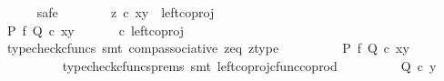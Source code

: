 \begin{isabellebody}
\ \ \ \ \isamarkupfalse%
\ safe\isanewline
\ \ \ \ \ \ \isamarkupfalse%
\ {\isachardoublequoteopen}z\ {\isasymcirc}\isactrlsub c\ {\isasymlangle}x{\isacharcomma}{\kern0pt}y{\isasymrangle}\ {\isacharequal}{\kern0pt}\ left{\isacharunderscore}{\kern0pt}coproj\ {\isasymone}\ {\isacharparenleft}{\kern0pt}{\isasymone}\ {\isasymCoprod}\ {\isasymone}{\isacharparenright}{\kern0pt}{\isachardoublequoteclose}\isanewline
\ \ \ \ \ \ \isamarkupfalse%
\ \isamarkupfalse%
\ {\isachardoublequoteopen}{\isacharparenleft}{\kern0pt}P\ {\isasymtimes}\isactrlsub f\ Q{\isacharparenright}{\kern0pt}\ {\isasymcirc}\isactrlsub c\ {\isasymlangle}x{\isacharcomma}{\kern0pt}y{\isasymrangle}\ {\isacharequal}{\kern0pt}\ {\isacharparenleft}{\kern0pt}{\isasymlangle}{\isasymt}{\isacharcomma}{\kern0pt}{\isasymt}{\isasymrangle}\ {\isasymamalg}\ {\isasymlangle}{\isasymf}{\isacharcomma}{\kern0pt}{\isasymf}{\isasymrangle}\ {\isasymamalg}\ {\isasymlangle}{\isasymf}{\isacharcomma}{\kern0pt}{\isasymt}{\isasymrangle}{\isacharparenright}{\kern0pt}\ {\isasymcirc}\isactrlsub c\ left{\isacharunderscore}{\kern0pt}coproj\ {\isasymone}\ {\isacharparenleft}{\kern0pt}{\isasymone}\ {\isasymCoprod}\ {\isasymone}{\isacharparenright}{\kern0pt}{\isachardoublequoteclose}\isanewline
\ \ \ \ \ \ \ \ \isamarkupfalse%
\ {\isacharparenleft}{\kern0pt}typecheck{\isacharunderscore}{\kern0pt}cfuncs{\isacharcomma}{\kern0pt}\ smt\ comp{\isacharunderscore}{\kern0pt}associative{}\ z{\isacharunderscore}{\kern0pt}eq\ z{\isacharunderscore}{\kern0pt}type{\isacharparenright}{\kern0pt}\isanewline
\ \ \ \ \ \ \isamarkupfalse%
\ \isamarkupfalse%
\ {\isachardoublequoteopen}{\isacharparenleft}{\kern0pt}P\ {\isasymtimes}\isactrlsub f\ Q{\isacharparenright}{\kern0pt}\ {\isasymcirc}\isactrlsub c\ {\isasymlangle}x{\isacharcomma}{\kern0pt}y{\isasymrangle}\ {\isacharequal}{\kern0pt}\ {\isasymlangle}{\isasymt}{\isacharcomma}{\kern0pt}{\isasymt}{\isasymrangle}{\isachardoublequoteclose}\isanewline
\ \ \ \ \ \ \ \ \isamarkupfalse%
\ {\isacharparenleft}{\kern0pt}typecheck{\isacharunderscore}{\kern0pt}cfuncs{\isacharunderscore}{\kern0pt}prems{\isacharcomma}{\kern0pt}\ smt\ left{\isacharunderscore}{\kern0pt}coproj{\isacharunderscore}{\kern0pt}cfunc{\isacharunderscore}{\kern0pt}coprod{\isacharparenright}{\kern0pt}\isanewline
\ \ \ \ \ \ \isamarkupfalse%
\ \isamarkupfalse%
\ {\isachardoublequoteopen}Q\ {\isasymcirc}\isactrlsub c\ y\ {\isacharequal}{\kern0pt}\ {\isasymt}{\isachardoublequoteclose}\isanewline

\end{isabellebody}
